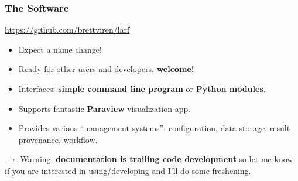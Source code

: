 \documentclass[xcolor=dvipsnames]{beamer}
\begin{document}
\begin{frame}
\end{frame}


\begin{frame}
  \frametitle{The Software}
  \begin{center}
    \url{https://github.com/brettviren/larf}
  \end{center}

  \begin{itemize}
  \item Expect a name change!
  \item Ready for other users and developers, \textbf{welcome!}
  \item Interfaces: \textbf{simple command line program} or 
    \textbf{Python modules}.
  \item Supports fantastic \textbf{Paraview} visualization app.
  \item Provides various ``management systems'': configuration, data
    storage, result provenance, workflow.
  \end{itemize}

  $\rightarrow$ Warning: \textbf{documentation is trailing code
    development} so let me know if you are interested in
  using/developing and I'll do some freshening.

\end{frame}
\end{document}
